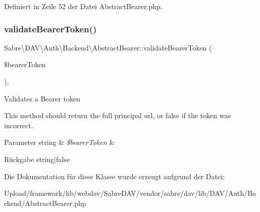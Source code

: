 Definiert in Zeile 52 der Datei Abstract\+Bearer.\+php.

\mbox{\label{class_sabre_1_1_d_a_v_1_1_auth_1_1_backend_1_1_abstract_bearer_a46ee5dcc2d55566e686b4da20450189f}} 
\subsubsection{\texorpdfstring{validate\+Bearer\+Token()}{validateBearerToken()}}
{\footnotesize\ttfamily Sabre\textbackslash{}\+D\+A\+V\textbackslash{}\+Auth\textbackslash{}\+Backend\textbackslash{}\+Abstract\+Bearer\+::validate\+Bearer\+Token (\begin{DoxyParamCaption}\item[{}]{\$bearer\+Token }\end{DoxyParamCaption})\hspace{0.3cm}{\ttfamily [abstract]}, {\ttfamily [protected]}}

Validates a Bearer token

This method should return the full principal url, or false if the token was incorrect.


\begin{DoxyParams}[1]{Parameter}
string & {\em \$bearer\+Token} & \\
\hline
\end{DoxyParams}
\begin{DoxyReturn}{Rückgabe}
string$\vert$false 
\end{DoxyReturn}


Die Dokumentation für diese Klasse wurde erzeugt aufgrund der Datei\+:\begin{DoxyCompactItemize}
\item 
Upload/framework/lib/webdav/\+Sabre\+D\+A\+V/vendor/sabre/dav/lib/\+D\+A\+V/\+Auth/\+Backend/Abstract\+Bearer.\+php\end{DoxyCompactItemize}
